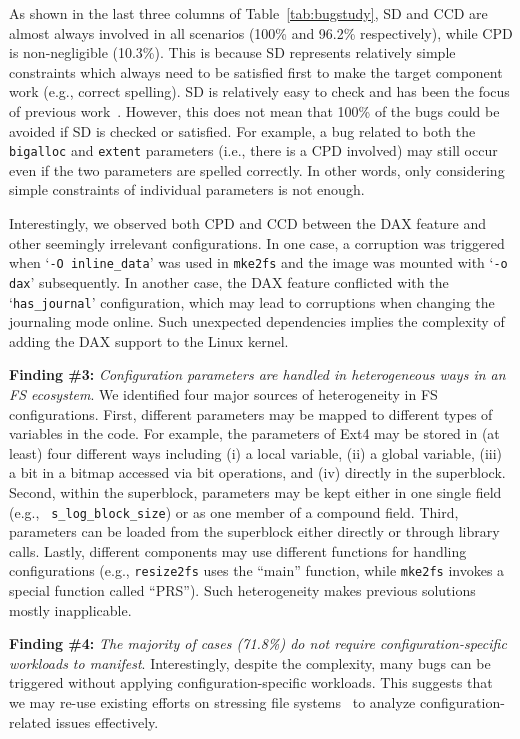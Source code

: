 As shown in the last three columns of Table~\ref{tab:bugstudy}, SD  and CCD  are almost always involved in all scenarios (100\% and 96.2\% respectively), while CPD is non-negligible (10.3\%).
This is because SD represents relatively simple constraints which always need to be satisfied first  {to make the target component work} (e.g.,  correct spelling). 
SD is relatively easy to check and has been the focus of previous work~\cite{Conferr-DSN08}.
However, this does not mean that 100\% of the bugs could be avoided if SD is checked or satisfied. 
For example, a bug related to both the \texttt{bigalloc} and \texttt{extent} parameters (i.e., there is a CPD involved) may still occur even if the two parameters are spelled correctly.
In other words, only considering  simple constraints of individual parameters is not enough. 

Interestingly, we observed both CPD and CCD between the DAX feature and other seemingly irrelevant configurations. 
 In one case, a corruption was triggered when
`\texttt{-O inline\_data}' was used in \texttt{mke2fs} and the image was mounted with `\texttt{-o dax}' subsequently. 
In another case, the DAX  feature conflicted with the  `\texttt{has\_journal}' configuration, which may lead to corruptions when changing the journaling mode online.   Such unexpected dependencies implies the complexity of adding the DAX support to the Linux kernel.

\smallskip
\noindent
{\textbf{Finding \#3:} \textit{Configuration parameters are handled in heterogeneous ways in an FS ecosystem}.} 
We identified four major sources of heterogeneity in  FS configurations. First, different parameters may be mapped to different types of variables in the code. For example,   the parameters of Ext4 may be stored  in (at least) four different ways including (i) a local variable, (ii) a global variable, (iii) a bit in a  bitmap   accessed via bit operations, and (iv) directly in the superblock.    
Second, within the superblock, parameters may be kept either in one single field (e.g., \texttt{ s\_log\_block\_size}) or as one member of a compound field. Third, parameters can be   loaded from the superblock either directly or through library calls. Lastly, different components may use different functions for handling configurations  (e.g., \texttt{resize2fs}  uses the ``main'' function, while \texttt{mke2fs} invokes a special function called ``PRS'').
Such heterogeneity makes previous solutions mostly inapplicable.

\smallskip
\noindent
 \textbf{Finding \#4:} \textit{The majority of cases (71.8\%)  do not require configuration-specific workloads to manifest}. 
Interestingly, despite the complexity, many bugs can be triggered without applying configuration-specific workloads. This  suggests that we may re-use existing efforts on stressing file systems~\cite{e2fsprogs-test,xfstest} to analyze configuration-related issues effectively.
